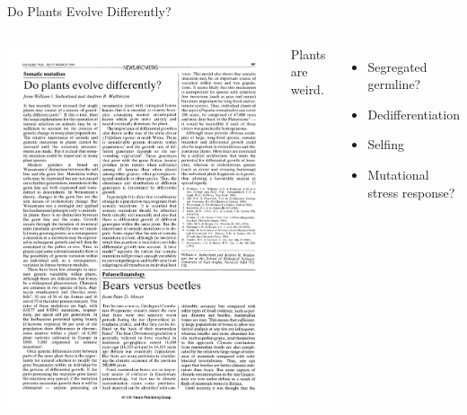 \documentclass{beamer}
\begin{document}
\begin{frame}{Do Plants Evolve Differently?}
	\begin{columns}
		\begin{alertblock}{}
			\includegraphics[trim={1.2cm 19cm 13.5cm 6.95cm},clip,width=\linewidth]{do_plants_evolve_differently.pdf}
		\end{alertblock}
		Plants are weird.
		\begin{itemize}
			\item Segregated germline?
			\item Dedifferentiation
			\item Selfing
			\item Mutational stress response?
		\end{itemize}


	\end{columns}




\end{frame}
\end{document}
